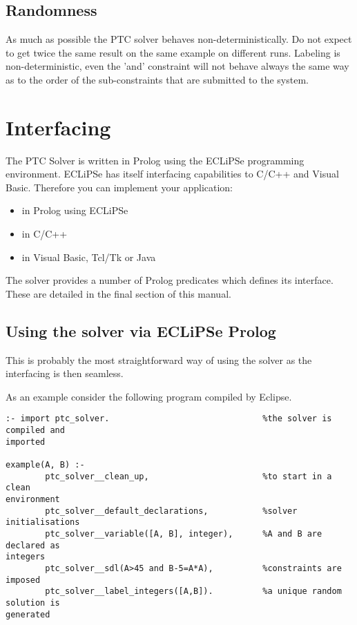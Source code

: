 \documentclass{article}
\begin{document}
\subsection{Randomness}

As much as possible the PTC solver behaves non-deterministically. Do not expect
to get twice the same result on the same example on
different runs. Labeling is non-deterministic, even the 'and' constraint will not
behave always the same way as to the order of the
sub-constraints that are submitted to the system.

\section{Interfacing}

The PTC Solver is written in Prolog using the ECLiPSe programming environment.
ECLiPSe has itself interfacing capabilities to C/C++ and Visual Basic.
Therefore you can implement your application:

\begin{itemize}
\item in Prolog using ECLiPSe
\item in C/C++
\item in Visual Basic, Tcl/Tk or Java
\end{itemize}

The solver provides a number of Prolog predicates which
defines its interface. These are detailed in the final
section of this manual.

\subsection{Using the solver via ECLiPSe Prolog}

This is probably the most straightforward way of using the solver as the
interfacing is
then seamless.

As an example consider the following program compiled by Eclipse.

\begin{verbatim}
:- import ptc_solver.                               %the solver is compiled and
imported

example(A, B) :-
        ptc_solver__clean_up,                       %to start in a clean
environment
        ptc_solver__default_declarations,           %solver initialisations
        ptc_solver__variable([A, B], integer),      %A and B are declared as
integers
        ptc_solver__sdl(A>45 and B-5=A*A),          %constraints are imposed
        ptc_solver__label_integers([A,B]).          %a unique random solution is
generated
\end{verbatim}
\end{document}

